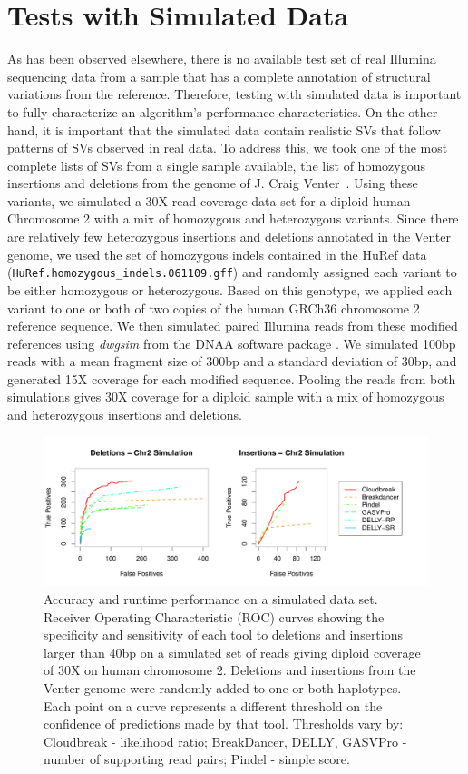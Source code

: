 \section{Tests with Simulated Data}

As has been observed elsewhere, there is no available test set of real Illumina sequencing data from a sample that has a complete annotation of structural variations from the reference. Therefore, testing with simulated data is important to fully characterize an algorithm's performance characteristics. On the other hand, it is important that the simulated data contain realistic SVs that follow patterns of SVs observed in real data. To address this, we took one of the most complete lists of SVs from a single sample available, the list of homozygous insertions and deletions from the genome of J. Craig Venter~\cite{Levy:2007fb}. Using these variants, we simulated a 30X read coverage data set for a diploid human Chromosome 2 with a mix of homozygous and heterozygous variants.  Since there are relatively few heterozygous insertions and deletions annotated in the Venter genome, we used the set of homozygous indels contained in the HuRef data (\texttt{HuRef.homozygous\_indels.061109.gff}) and randomly assigned each variant to be either homozygous or heterozygous. Based on this genotype, we applied each variant to one or both of two copies of the human GRCh36 chromosome 2 reference sequence. We then simulated paired Illumina reads from these modified references using \emph{dwgsim} from the DNAA software package \cite{DNAA}. We simulated 100bp reads with a mean fragment size of 300bp and a standard deviation of 30bp, and generated 15X coverage for each modified sequence. Pooling the reads from both simulations gives 30X coverage for a diploid sample with a mix of homozygous and heterozygous insertions and deletions.


\begin{figure}
\centering
\includegraphics[width=1\textwidth]{figures/CHR2SIM_ROC_COMBINED_ROCS_POSTER.pdf}
\caption{Accuracy and runtime performance on a simulated data set. Receiver Operating Characteristic (ROC) curves showing the specificity and sensitivity of each tool to deletions and insertions larger than 40bp on a simulated set of reads giving diploid coverage of 30X on human chromosome 2. Deletions and insertions from the Venter genome were randomly added to one or both haplotypes. Each point on a curve represents a different threshold on the confidence of predictions made by that tool. Thresholds vary by: Cloudbreak - likelihood ratio; BreakDancer, DELLY, GASVPro - number of supporting read pairs; Pindel - simple score.}
\label{chr2CombinedRoc}
\end{figure}

